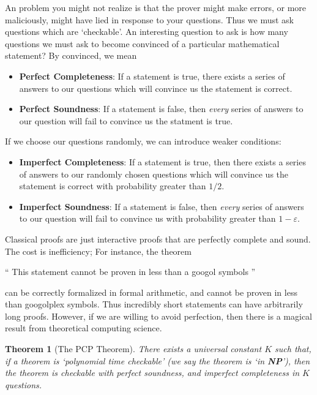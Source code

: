 \documentclass{article}
\theoremstyle{plain}
\newtheorem{theorem}{Theorem}
\theoremstyle{definition}
\begin{document}
An problem you might not realize is that the prover might make errors, or more maliciously, might have lied in response to your questions. Thus we must ask questions which are `checkable'. An interesting question to ask is how many questions we must ask to become convinced of a particular mathematical statement? By convinced, we mean
%
\begin{itemize}
    \item {\bf Perfect Completeness}: If a statement is true, there exists a series of answers to our questions which will convince us the statement is correct.

    \item {\bf Perfect Soundness}: If a statement is false, then {\it every} series of answers to our question will fail to convince us the statment is true.
\end{itemize}
%
If we choose our questions randomly, we can introduce weaker conditions:
%
\begin{itemize}
    \item {\bf Imperfect Completeness}: If a statement is true, then there exists a series of answers to our randomly chosen questions which will convince us the statement is correct with probability greater than $1/2$.

    \item {\bf Imperfect Soundness}: If a statement is false, then {\it every} series of answers to our question will fail to convince us with probability greater than $1 - \varepsilon$.
\end{itemize}
%
Classical proofs are just interactive proofs that are perfectly complete and sound. The cost is inefficiency; For instance, the theorem
%
\begin{center} `` This statement cannot be proven in less than a googol symbols '' \end{center}
%
can be correctly formalized in formal arithmetic, and cannot be proven in less than googolplex symbols. Thus incredibly short statements can have arbitrarily long proofs. However, if we are willing to avoid perfection, then there is a magical result from theoretical computing science.

\begin{theorem}[The PCP Theorem]
    There exists a universal constant $K$ such that, if a theorem is `polynomial time checkable' (we say the theorem is `in {\bf NP}'), then the theorem is checkable with perfect soundness, and imperfect completeness in $K$ questions.
\end{theorem}
\end{document}
